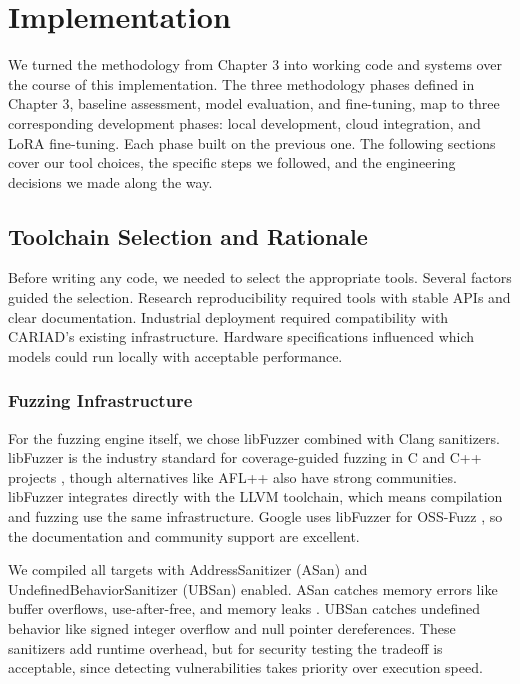 
\chapter{Implementation}
\label{chap:implementation}

We turned the methodology from Chapter 3 into working code and systems over the course of this implementation. The three methodology phases defined in Chapter 3, baseline assessment, model evaluation, and fine-tuning, map to three corresponding development phases: local development, cloud integration, and LoRA fine-tuning. Each phase built on the previous one. The following sections cover our tool choices, the specific steps we followed, and the engineering decisions we made along the way.

\section{Toolchain Selection and Rationale}
\label{sec:impl_toolchain}

Before writing any code, we needed to select the appropriate tools. Several factors guided the selection. Research reproducibility required tools with stable APIs and clear documentation. Industrial deployment required compatibility with CARIAD's existing infrastructure. Hardware specifications influenced which models could run locally with acceptable performance.

\subsection{Fuzzing Infrastructure}

For the fuzzing engine itself, we chose libFuzzer combined with Clang sanitizers. libFuzzer is the industry standard for coverage-guided fuzzing in C and C++ projects \cite{LibFuzzer2015}, though alternatives like AFL++ \cite{AFLPlusPlus} also have strong communities. libFuzzer integrates directly with the LLVM toolchain, which means compilation and fuzzing use the same infrastructure. Google uses libFuzzer for OSS-Fuzz \cite{OSSFuzzBugs2021}, so the documentation and community support are excellent.

We compiled all targets with AddressSanitizer (ASan) and UndefinedBehaviorSanitizer (UBSan) enabled. ASan catches memory errors like buffer overflows, use-after-free, and memory leaks \cite{LibFuzzer2015}. UBSan catches undefined behavior like signed integer overflow and null pointer dereferences. These sanitizers add runtime overhead, but for security testing the tradeoff is acceptable, since detecting vulnerabilities takes priority over execution speed.

